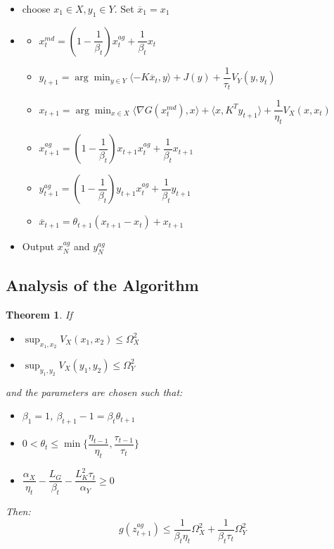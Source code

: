 \documentclass[12pt,reqno]{amsart}
\newtheorem{thm}{Theorem}[section]
\numberwithin{equation}{section}
\begin{document}
\begin{itemize}
\item choose $x_{1} \in X, y_{1} \in Y$. Set $\overline{x}_{1} = x_{1}$
\item

\begin{itemize}
\item $x_{t}^{md} = (1 - \dfrac{1}{\beta_{t}})x_{t}^{ag} +  \dfrac{1}{\beta_{t}}x_{t}$
\item $y_{t+1} = \arg\min_{y \in Y} \langle -K\overline{x}_{t},y\rangle + J(y) + \dfrac{1}{\tau_{t}}V_{Y}(y,y_{t})$
\item $x_{t+1} = \arg\min_{x \in X} \langle \nabla G(x_{t}^{md}) ,x \rangle + \langle x,K^{T}y_{t+1} \rangle + \dfrac{1}{\eta_{t}}V_{X}(x,x_{t})$
\item $x_{t+1}^{ag} = (1 -  \dfrac{1}{\beta_{t}})x_{t+1}x_{t}^{ag}+ \dfrac{1}{\beta_{t}}x_{t+1}$
\item $y_{t+1}^{ag} = (1 -  \dfrac{1}{\beta_{t}})y_{t+1}x_{t}^{ag}+ \dfrac{1}{\beta_{t}}y_{t+1}$
\item $\overline{x}_{t+1} = \theta_{t+1}(x_{t+1} - x_{t}) + x_{t+1}$
\end{itemize}

\item Output $x_{N}^{ag}$ and $y_{N}^{ag}$
\end{itemize}

\subsection{Analysis of the Algorithm}

\begin{thm}


If

\begin{itemize}
\item $\sup_{x_{1},x_{2}} V_{X}(x_{1},x_{2}) \leq \Omega_{X}^{2}$
\item $\sup_{y_{1},y_{2}} V_{X}(y_{1},y_{2}) \leq \Omega_{Y}^{2}$
\end{itemize}

and the parameters are chosen such that:

\begin{itemize}
\item $\beta_{1} = 1$, $\beta_{t+1} - 1 = \beta_{t}\theta_{t+1}$
\item $0 < \theta_{t} \leq \min\{ \dfrac{\eta_{t-1}}{\eta_{t}}, \dfrac{\tau_{t-1}}{\tau_{t}}\}$
\item $\dfrac{\alpha_{X}}{\eta_{t}} - \dfrac{L_{G}}{\beta_{t}} - \dfrac{L_{K}^{2}\tau_{t}}{\alpha_{Y}} \geq 0$
\end{itemize}

Then:
$$
g(z_{t+1}^{ag}) \leq \dfrac{1}{\beta_{t}\eta_{t}}\Omega_{X}^{2} + \dfrac{1}{\beta_{t}\tau_{t}}\Omega_{Y}^{2}
$$


\end{thm}
\end{document}

